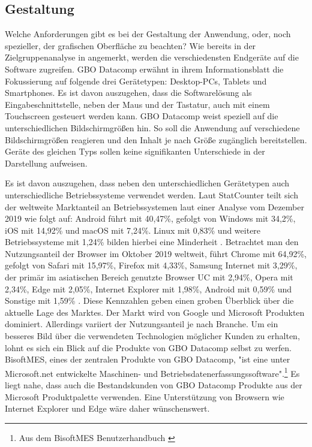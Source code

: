 \subsection{Gestaltung}
\label{subsec:gestaltung}
Welche Anforderungen gibt es bei der Gestaltung der Anwendung, oder, noch spezieller, 
der grafischen Oberfläche zu beachten? Wie bereits in der Zielgruppenanalyse in 
angemerkt, werden die verschiedensten Endgeräte auf die Software zugreifen.
GBO Datacomp erwähnt in ihrem Informationsblatt die Fokussierung auf folgende
drei Gerätetypen: Desktop-PCs, Tablets und Smartphones. Es ist davon auszugehen, dass die
Softwarelösung als Eingabeschnittstelle, neben der Maus und der Tastatur, auch mit einem Touchscreen
gesteuert werden kann. GBO Datacomp weist speziell auf die unterschiedlichen Bildschirmgrößen
hin. So soll die Anwendung auf verschiedene Bildschirmgrößen reagieren und den Inhalt je nach
Größe zugänglich bereitstellen. Geräte des gleichen Typs sollen keine signifikanten Unterschiede
in der Darstellung aufweisen.

Es ist davon auszugehen, dass neben den unterschiedlichen Gerätetypen auch unterschiedliche
Betriebssysteme verwendet werden. Laut StatCounter teilt sich der weltweite Marktanteil
an Betriebssystemen laut einer Analyse vom Dezember 2019 wie folgt auf: Android führt mit
40,47\%, gefolgt von Windows mit 34,2\%, iOS mit 14,92\% und macOS mit 7,24\%. Linux mit 0,83\% und weitere
Betriebssysteme mit 1,24\% bilden hierbei eine Minderheit \cite{StatCounterOSMarketShare}. Betrachtet man den
Nutzungsanteil der Browser im Oktober 2019 weltweit, führt Chrome mit 64,92\%, gefolgt von Safari mit 15,97\%,
Firefox mit 4,33\%, Samsung Internet mit 3,29\%, der primär im asiatischen Bereich genutzte Browser UC
mit 2,94\%, Opera mit 2,34\%, Edge mit 2,05\%, Internet Explorer mit 1,98\%, Android mit 0,59\% und Sonstige mit 1,59\% \cite{StatCounterBrowserMarketShare}.
Diese Kennzahlen geben einen groben Überblick über die aktuelle Lage des Marktes. Der Markt wird von
Google und Microsoft Produkten dominiert. Allerdings variiert der Nutzungsanteil je nach Branche.
Um ein besseres Bild über die verwendeten Technologien möglicher Kunden zu erhalten,
lohnt es sich ein Blick auf die Produkte von GBO Datacomp selbst zu werfen.
BisoftMES, eines der zentralen Produkte von GBO Datacomp, "ist eine unter Microsoft.net
entwickelte Maschinen- und Betriebsdatenerfassungssoftware".\footnote{Aus dem BisoftMES Benutzerhandbuch \cite[S. 7]{BisoftMESHandbuch}}
Es liegt nahe, dass auch die Bestandskunden von GBO Datacomp Produkte aus der Microsoft
Produktpalette verwenden. Eine Unterstützung von Browsern wie Internet Explorer und Edge
wäre daher wünschenswert.

